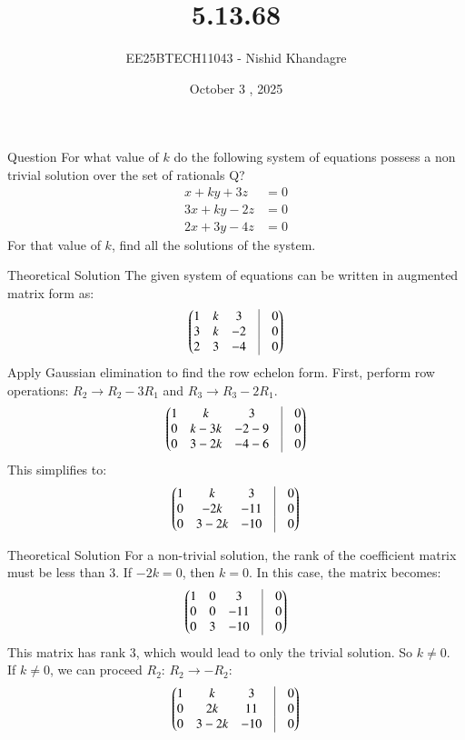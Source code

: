 \documentclass{beamer}
\title
{5.13.68}
\date{October 3 , 2025}
\author
{EE25BTECH11043 - Nishid Khandagre}
\begin{document}
\frame{\titlepage}

\begin{frame}{Question}
For what value of $k$ do the following system of equations possess a non trivial solution over the set of rationals Q?
\begin{align*}
x + ky + 3z &= 0 \\
3x + ky - 2z &= 0 \\
2x + 3y - 4z &= 0
\end{align*}
For that value of $k$, find all the solutions of the system.
\end{frame}

\begin{frame}{Theoretical Solution}
The given system of equations can be written in augmented matrix form as:
\begin{align}
\myvec{
1 & k & 3 & \vrule & 0 \\
3 & k & -2 & \vrule & 0 \\
2 & 3 & -4 & \vrule & 0
}
\end{align}
Apply Gaussian elimination to find the row echelon form.
First, perform row operations: $R_2 \rightarrow R_2 - 3R_1$ and $R_3 \rightarrow R_3 - 2R_1$.
\begin{align}
\myvec{
1 & k & 3 & \vrule & 0 \\
0 & k - 3k & -2 - 9 & \vrule & 0 \\
0 & 3 - 2k & -4 - 6 & \vrule & 0
}
\end{align}
This simplifies to:
\begin{align}
\myvec{
1 & k & 3 & \vrule & 0 \\
0 & -2k & -11 & \vrule & 0 \\
0 & 3 - 2k & -10 & \vrule & 0
}
\end{align}
\end{frame}

\begin{frame}{Theoretical Solution}
For a non-trivial solution, the rank of the coefficient matrix must be less than 3.
If $-2k = 0$, then $k=0$. In this case, the matrix becomes:
\begin{align}
\myvec{
1 & 0 & 3 & \vrule & 0 \\
0 & 0 & -11 & \vrule & 0 \\
0 & 3 & -10 & \vrule & 0
}
\end{align}
This matrix has rank 3, which would lead to only the trivial solution. So $k \neq 0$.\\
If $k \neq 0$, we can proceed
$R_2$: $R_2 \rightarrow -R_2$:
\begin{align}
\myvec{
1 & k & 3 & \vrule & 0 \\
0 & 2k & 11 & \vrule & 0 \\
0 & 3 - 2k & -10 & \vrule & 0
}
\end{align}
\end{frame}
\end{document}
